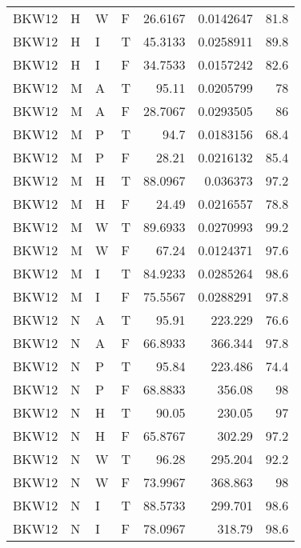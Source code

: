 \begin{table}[!htb]
{\begin{tabular}{llllrrr}
            BKW12    & H     & W     & F          & 26.6167    & 0.0142647  & 81.8     \\
            BKW12    & H     & I     & T          & 45.3133    & 0.0258911  & 89.8     \\
            BKW12    & H     & I     & F          & 34.7533    & 0.0157242  & 82.6     \\
            BKW12    & M     & A     & T          & 95.11      & 0.0205799  & 78       \\
            BKW12    & M     & A     & F          & 28.7067    & 0.0293505  & 86       \\
            BKW12    & M     & P     & T          & 94.7       & 0.0183156  & 68.4     \\
            BKW12    & M     & P     & F          & 28.21      & 0.0216132  & 85.4     \\
            BKW12    & M     & H     & T          & 88.0967    & 0.036373   & 97.2     \\
            BKW12    & M     & H     & F          & 24.49      & 0.0216557  & 78.8     \\
            BKW12    & M     & W     & T          & 89.6933    & 0.0270993  & 99.2     \\
            BKW12    & M     & W     & F          & 67.24      & 0.0124371  & 97.6     \\
            BKW12    & M     & I     & T          & 84.9233    & 0.0285264  & 98.6     \\
            BKW12    & M     & I     & F          & 75.5567    & 0.0288291  & 97.8     \\
            BKW12    & N     & A     & T          & 95.91      & 223.229    & 76.6     \\
            BKW12    & N     & A     & F          & 66.8933    & 366.344    & 97.8     \\
            BKW12    & N     & P     & T          & 95.84      & 223.486    & 74.4     \\
            BKW12    & N     & P     & F          & 68.8833    & 356.08     & 98       \\
            BKW12    & N     & H     & T          & 90.05      & 230.05     & 97       \\
            BKW12    & N     & H     & F          & 65.8767    & 302.29     & 97.2     \\
            BKW12    & N     & W     & T          & 96.28      & 295.204    & 92.2     \\
            BKW12    & N     & W     & F          & 73.9967    & 368.863    & 98       \\
            BKW12    & N     & I     & T          & 88.5733    & 299.701    & 98.6     \\
            BKW12    & N     & I     & F          & 78.0967    & 318.79     & 98.6     \\
            \hline
        \end{tabular}
    }{}
\end{table}